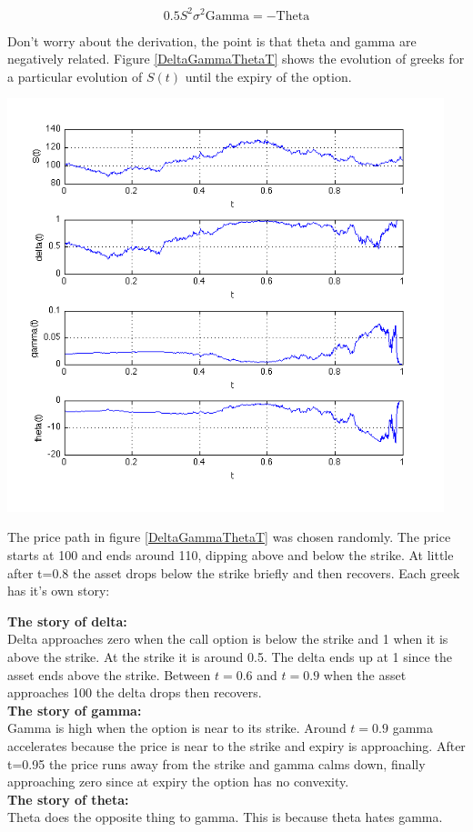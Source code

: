 \[ 0.5 S^2 \sigma^2 \mbox{Gamma} = -\mbox{Theta}\]

Don't worry about the derivation, the point is that theta and gamma are negatively related. Figure \ref{DeltaGammaThetaT} shows the evolution of greeks for a particular evolution of $S(t)$ until the expiry of the option.

\begin{center}
\includegraphics[width=5in]{pics/DeltaGammaThetaT.png}
\label{DeltaGammaThetaT}
\end{center}

The price path in figure \ref{DeltaGammaThetaT} was chosen randomly. The price starts at 100 and ends around 110, dipping above and below the strike. At little after t=0.8 the asset drops below the strike briefly and then recovers. Each greek has it's own story:


\textbf{The story of delta:}\\ Delta approaches zero when the call option is below the strike and 1 when it is above the strike. At the strike it is around 0.5.  The delta ends up at 1 since the asset ends above the strike. Between $t=0.6$ and $t=0.9$ when the asset approaches 100 the delta drops then recovers.\\
\textbf{The story of gamma:}\\ Gamma is high when the option is near to its strike. Around  $t=0.9$ gamma accelerates because the price is near to the strike and expiry is approaching. After t=0.95 the price runs away from the strike and gamma calms down, finally approaching zero since at expiry the option has no convexity.\\
\textbf{The story of theta:}\\ Theta does the opposite thing to gamma. This is because theta hates gamma.



